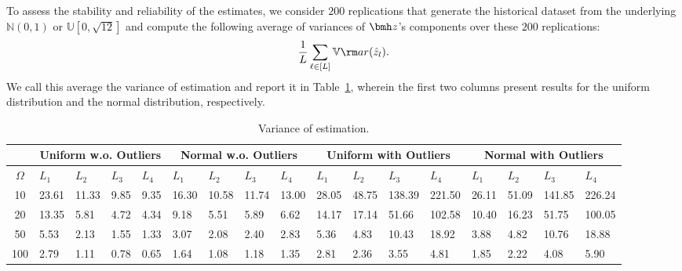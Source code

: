 \documentclass[opre, blindrev]{informs4}
\newcommand{\1}[1]{\mathds{1}{\left(#1\right)}}
\begin{document}
To assess the stability and reliability of the estimates, we consider $200$ replications that generate the historical dataset from the underlying $\mathbb{N}(0,1)$ or $\mathbb{U}[0,\sqrt{12}]$ and compute the following average of variances of $\bmh z$'s components over these $200$ replications:
\[
\frac{1}{L} \sum_{\ell \in [L]} \mathbb{V}{\rm ar}(\hat{z}_l).
\]
We call this average the variance of estimation and report it in Table~\ref{tab:estimation_normal_uniform}, wherein the first two columns present results for the uniform distribution and the normal distribution, respectively. 

\begin{table}[htb]
\scriptsize
\centering
\begin{tabularx}{1.0\textwidth}
{>{\hspace{-5pt}}c<{\hspace{-3pt}}||XXXX|XXXX|XXXX|XXXX}
\hline \hline
&\multicolumn{4}{c|}{Uniform w.o. Outliers} & \multicolumn{4}{c|}{Normal w.o. Outliers} &\multicolumn{4}{c|}{Uniform with Outliers} & \multicolumn{4}{c}{Normal with Outliers}  \\
\cline{2-17}
$\Omega$ & $L_1$ & $L_{2}$ & $L_3$ & $L_{4}$ & $L_1$ & $L_{2}$ & $L_3$ & $L_{4}$ & $L_1$ & $L_{2}$ & $L_3$ & $L_{4}$ & $L_1$ & $L_{2}$ & $L_3$ & $L_{4}$   \\
\hline
10  & 23.61   & 11.33 & 9.85 & 9.35 & 16.30  & 10.58 & 11.74 & 13.00 & 28.05             & 48.75 & 138.39 & 221.50 & 26.11            & 51.09 & 141.85 & 226.24 \\
20  & 13.35   & 5.81  & 4.72 & 4.34 & 9.18   & 5.51  & 5.89  & 6.62  & 14.17             & 17.14 & 51.66  & 102.58 & 10.40            & 16.23 & 51.75  & 100.05 \\
50  & 5.53    & 2.13  & 1.55 & 1.33 & 3.07   & 2.08  & 2.40  & 2.83  & 5.36              & 4.83  & 10.43  & 18.92  & 3.88             & 4.82  & 10.76  & 18.88  \\
100 & 2.79    & 1.11  & 0.78 & 0.65 & 1.64   & 1.08  & 1.18  & 1.35  & 2.81              & 2.36  & 3.55   & 4.81   & 1.85             & 2.22  & 4.08   & 5.90   \\
\hline \hline
\end{tabularx}
\vspace{4 pt}
\caption{Variance of estimation.}
\label{tab:estimation_normal_uniform}
\end{table}
\end{document}
